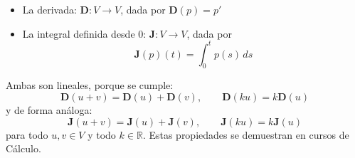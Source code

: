 \begin{enumerate}[label=\alph*.]
  \begin{itemize}
    \item La derivada: \( \mathbf{D}: V \rightarrow V \), dada por \( \mathbf{D}(p) = p' \)
    \item La integral definida desde 0: \( \mathbf{J}: V \rightarrow V \), dada por
    \[
      \mathbf{J}(p)(t) = \int_0^t p(s) \, ds
    \]
  \end{itemize}
  Ambas son lineales, porque se cumple:
  \[
    \mathbf{D}(u + v) = \mathbf{D}(u) + \mathbf{D}(v), \qquad \mathbf{D}(ku) = k\mathbf{D}(u)
  \]
  y de forma análoga:
  \[
    \mathbf{J}(u + v) = \mathbf{J}(u) + \mathbf{J}(v), \qquad \mathbf{J}(ku) = k\mathbf{J}(u)
  \]
  para todo \( u, v \in V \) y todo \( k \in \mathbb{R} \). Estas propiedades se demuestran en cursos de Cálculo.
\end{enumerate}